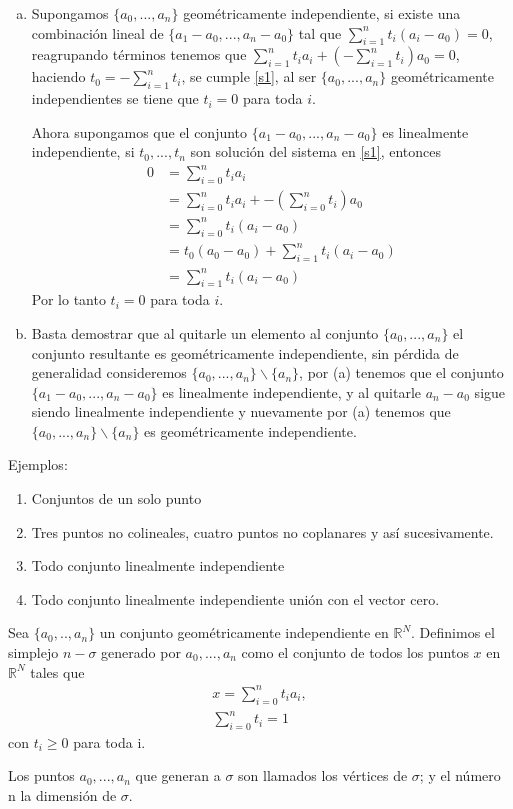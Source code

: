 \begin{Dem}
\begin{enumerate}[(a)]
\item Supongamos $\{a_0,...,a_n\}$ geométricamente independiente, si existe una combinación lineal de $\{a_1-a_0,...,a_n-a_0\}$ tal que $\sum_{i=1}^{n}t_i(a_i-a_0)=0$, reagrupando términos tenemos que $\sum_{i=1}^{n}t_ia_i + (-\sum_{i=1}^{n}t_i)a_0=0$, haciendo $t_0 = -\sum_{i=1}^{n}t_i$, se cumple \ref{s1}, al ser $\{a_0,...,a_n\}$ geométricamente independientes se tiene que $t_i=0$ para toda $i$.

Ahora supongamos que el conjunto $\{a_1-a_0,...,a_n-a_0\}$ es linealmente independiente, si $t_0,...,t_n$ son solución del sistema en \ref{s1}, entonces 
\begin{align*}
 0&=\sum_{i=0}^{n}t_ia_i\\
 &=\sum_{i=0}^{n}t_ia_i + -(\sum_{i=0}^{n}t_i)a_0\\
 &=\sum_{i=0}^{n}t_i(a_i-a_0)\\ 
 &= t_0(a_0-a_0) + \sum_{i=1}^{n}t_i(a_i-a_0)\\
 &=\sum_{i=1}^{n}t_i(a_i-a_0)
\end{align*}
Por lo tanto $t_i=0$ para toda $i$.
\item Basta demostrar que al quitarle un elemento al conjunto $\{a_0,...,a_n\}$
el conjunto resultante es geométricamente independiente, sin pérdida
de generalidad consideremos $\{a_0,...,a_n\}\backslash\{a_n\}$, por (a) tenemos que el
conjunto $\{a_1-a_0,...,a_n-a_0\}$ es linealmente independiente, y al quitarle
$a_n-a_0$ sigue siendo linealmente independiente y nuevamente por (a) 
tenemos que $\{a_0,...,a_n\}\backslash\{a_n\}$ es geométricamente independiente.
\end{enumerate}
\end{Dem}
Ejemplos:
\begin{enumerate}
\item Conjuntos de un solo punto
\item Tres puntos no colineales, cuatro puntos no coplanares y así sucesivamente.  
\item Todo conjunto linealmente independiente
\item Todo conjunto linealmente independiente unión con el vector cero. 
\end{enumerate}

\begin{Defi}[Simplejo]
Sea $\{a_0,..,a_n\}$ un conjunto geométricamente independiente en  $\mathbb{R}^{N}$. Definimos el simplejo  $n-\sigma$ generado por $a_0,...,a_n$ como el conjunto de todos los puntos $x$ en $\mathbb{R}^{N}$ tales que 
\begin{equation}\label{s2}
\begin{split}
x = \sum_{i=0}^{n}t_ia_i,\\
\sum_{i=0}^{n}t_i=1
\end{split}
\end{equation}
con $t_i\geqslant 0$ para toda i.

Los puntos $a_0,...,a_n$ que generan a $\sigma$ son llamados los vértices de $\sigma$; y el número n la dimensión de $\sigma$.
\end{Defi}

